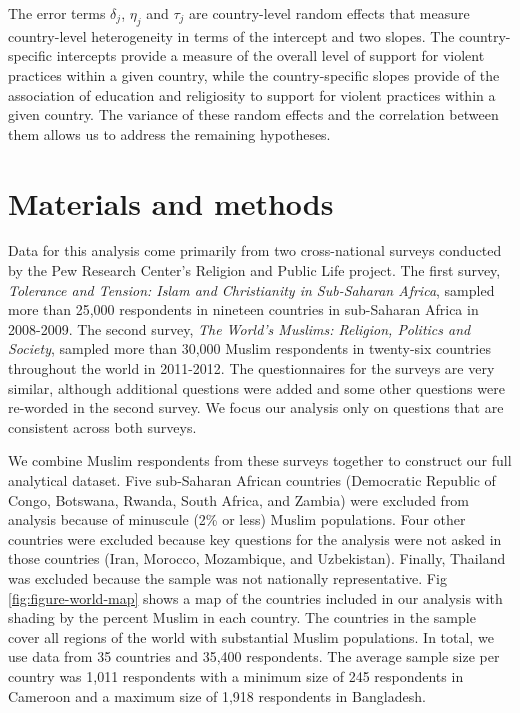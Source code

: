 \documentclass[10pt,letterpaper]{article}
\begin{document}
The error terms \(\delta_j\), \(\eta_j\) and \(\tau_j\) are country-level random effects that measure country-level heterogeneity in terms of the intercept and two slopes. The country-specific intercepts provide a measure of the overall level of support for violent practices within a given country, while the country-specific slopes provide of the association of education and religiosity to support for violent practices within a given country. The variance of these random effects and the correlation between them allows us to address the remaining hypotheses.

\section*{Materials and methods}

Data for this analysis come primarily from two cross-national surveys conducted by the Pew Research Center's Religion and Public Life project. The first survey, \emph{Tolerance and Tension: Islam and Christianity in Sub-Saharan Africa}, sampled more than 25,000 respondents in nineteen countries in sub-Saharan Africa in 2008-2009. The second survey, \emph{The World's Muslims: Religion, Politics and Society}, sampled more than 30,000 Muslim respondents in twenty-six countries throughout the world in 2011-2012. The questionnaires for the surveys are very similar, although additional questions were added and some other questions were re-worded in the second survey. We focus our analysis only on questions that are consistent across both surveys.

We combine Muslim respondents from these surveys together to construct our full analytical dataset. Five sub-Saharan African countries (Democratic Republic of Congo, Botswana, Rwanda, South Africa, and Zambia) were excluded from analysis because of minuscule (2\% or less) Muslim populations. Four other countries were excluded because key questions for the analysis were not asked in those countries (Iran, Morocco, Mozambique, and Uzbekistan). Finally, Thailand was excluded because the sample was not nationally representative. Fig \ref{fig:figure-world-map} shows a map of the countries included in our analysis with shading by the percent Muslim in each country. The countries in the sample cover all regions of the world with substantial Muslim populations. In total, we use data from 35 countries and 35,400 respondents. The average sample size per country was 1,011 respondents with a minimum size of 245 respondents in Cameroon and a maximum size of 1,918 respondents in Bangladesh.
\end{document}
